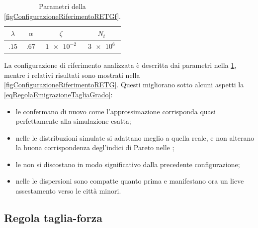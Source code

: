       \begin{table}[htb]
        \centering
        \caption{Parametri della \cref{figConfigurazioneRiferimentoRETGf}.}
        \begin{tabular}{cccc}
          \hline
          \(\lambda\)&\(\alpha\)&\(\zeta\)&\(N_t\)\\
          \hline
          \(\num{.15}\)&\(\num{.67}\)&\(\num{1e-2}\)&\(\num{3e6}\)\\
          \hline
        \end{tabular}
        \label{tabParametriRETGf}
      \end{table}

      La configurazione di riferimento analizzata è descritta dai parametri nella \cref{tabParametriRETGf}, mentre i relativi risultati sono mostrati nella \cref{figConfigurazioneRiferimentoRETG}. Questi migliorano sotto alcuni aspetti la \ref{eqRegolaEmigrazioneTagliaGrado}: 

      \begin{itemize}[
        label=\(\diamond\),
      ]
        \item le  confermano di nuovo come l'approssimazione corrisponda quasi perfettamente alla simulazione esatta;
        \item nelle  le distribuzioni simulate si adattano meglio a quella reale, e non alterano la buona corrispondenza degl'indici di Pareto nelle ;
        \item le  non si discostano in modo significativo dalla precedente configurazione;
        \item nelle  le dispersioni sono compatte quanto prima e manifestano ora un lieve assestamento verso le città minori.
      \end{itemize}

    \subsection{Regola taglia-forza}\label{secRETF}


